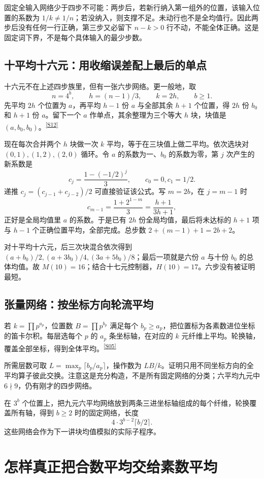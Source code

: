 \documentclass[11pt,a4paper,oneside,openany]{book}
\newcommand{\src}[1]{\textsuperscript{\hyperref[source:#1]{[#1]}}}
\theoremstyle{definition}\newtheorem{example}[theorem]{例}\newtheorem{conjecture}[theorem]{猜想}
\numberwithin{equation}{chapter}\setcounter{tocdepth}{1}
\begin{document}
固定全输入网络少于四步不可能：两步后，若新行纳入第一组外的位置，该输入位置的系数为 $1/k\ne1/n$；若没纳入，则支撑不足。未动行也不是全均值行。因此两步后没有任何一行正确，第三步又必留下 $n-k>0$ 行不动，不能全体正确。这是固定词下界，不是每个具体输入的最少步数。

\section{十平均十六元：用收缩误差配上最后的单点}
十六元不在上述四步族里，但有一张六步网络。更一般地，取
\[n=4^b,\qquad h=(n-1)/3,\qquad k=2h,\qquad b\ge1.
\]
先平均 $2h$ 个位置为 $a$，再平均 $h-1$ 份 $a$ 与全部其余 $h+1$ 个位置，得 $2h$ 份 $b_0$ 和 $h+1$ 份 $a$。留下一个 $a$ 作单点，其余整理为三个等大 $h$ 块，块值是 $(a,b_0,b_0)$。\src{S12}

现在每次合并两个 $h$ 块做一次 $k$ 平均，等于在三块值上做二平均。依次选块对 $(0,1),(1,2),(2,0)$ 循环。令 $a$ 的系数为一、$b_0$ 的系数为零，第 $j$ 次产生的新系数是
\[c_j=\frac{1-(-1/2)^j}{3},\qquad c_0=0,c_1=1/2.
\]
递推 $c_j=(c_{j-1}+c_{j-2})/2$ 可直接验证该公式。写 $m=2b$，在 $j=m-1$ 时
\[c_{m-1}=\frac{1+2^{1-m}}3=\frac{h+1}{3h+1},
\]
正好是全局均值里 $a$ 的系数。于是已有 $2h$ 份全局均值，最后将未达标的 $h+1$ 项与 $h-1$ 个正确位置平均，全部完成。总步数 $2+(m-1)+1=2b+2$。

对十平均十六元，后三次块混合依次得到 $(a+b_0)/2,(a+3b_0)/4,(3a+5b_0)/8$；最后一项就是六份 $a$ 与十份 $b_0$ 的总体均值。故 $M(10)=16$；结合十七元控制器，$H(10)=17$。六步没有被证明最短。

\section{张量网络：按坐标方向轮流平均}
若 $k=\prod p^{a_p}$，位置数 $B=\prod p^{b_p}$ 满足每个 $b_p\ge a_p$，把位置标为各素数进位坐标的笛卡尔积。每层选每个 $p$ 的 $a_p$ 条坐标轴，在对应的 $k$ 元纤维上平均。轮换轴，覆盖全部坐标，得到全体平均。\src{S05}

所需层数可取 $L=\max_p\lceil b_p/a_p\rceil$，操作数为 $LB/k$。证明只用不同坐标方向的全平均算子彼此交换。注意这是充分构造，不是所有固定网络的分类；六平均九元中 $6\nmid9$，仍有刚才的四步网络。

在 $3^b$ 个位置上，把九元六平均网络放到两条三进坐标轴组成的每个纤维，轮换覆盖所有轴，得到 $b\ge2$ 时的固定网络，长度
\[4\cdot3^{b-2}\lceil b/2\rceil.
\]
这些网络会作为下一讲块均值模拟的实际子程序。


\chapter{怎样真正把合数平均交给素数平均}\label{ch:transfer}
\end{document}
